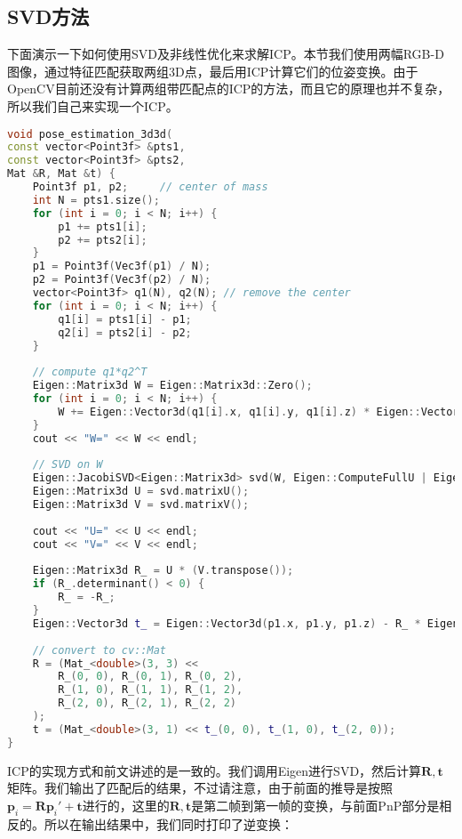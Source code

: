 \subsection{SVD方法}
下面演示一下如何使用SVD及非线性优化来求解ICP。本节我们使用两幅RGB-D图像，通过特征匹配获取两组3D点，最后用ICP计算它们的位姿变换。由于OpenCV目前还没有计算两组带匹配点的ICP的方法，而且它的原理也并不复杂，所以我们自己来实现一个ICP。
\begin{lstlisting}[language=c++,caption=slambook2/ch7/pose\_estimation\_3d3d.cpp（片段）]
void pose_estimation_3d3d(
const vector<Point3f> &pts1,
const vector<Point3f> &pts2,
Mat &R, Mat &t) {
	Point3f p1, p2;     // center of mass
	int N = pts1.size();
	for (int i = 0; i < N; i++) {
		p1 += pts1[i];
		p2 += pts2[i];
	}
	p1 = Point3f(Vec3f(p1) / N);
	p2 = Point3f(Vec3f(p2) / N);
	vector<Point3f> q1(N), q2(N); // remove the center
	for (int i = 0; i < N; i++) {
		q1[i] = pts1[i] - p1;
		q2[i] = pts2[i] - p2;
	}
	
	// compute q1*q2^T
	Eigen::Matrix3d W = Eigen::Matrix3d::Zero();
	for (int i = 0; i < N; i++) {
		W += Eigen::Vector3d(q1[i].x, q1[i].y, q1[i].z) * Eigen::Vector3d(q2[i].x, q2[i].y, q2[i].z).transpose();
	}
	cout << "W=" << W << endl;
	
	// SVD on W
	Eigen::JacobiSVD<Eigen::Matrix3d> svd(W, Eigen::ComputeFullU | Eigen::ComputeFullV);
	Eigen::Matrix3d U = svd.matrixU();
	Eigen::Matrix3d V = svd.matrixV();
	
	cout << "U=" << U << endl;
	cout << "V=" << V << endl;
	
	Eigen::Matrix3d R_ = U * (V.transpose());
	if (R_.determinant() < 0) {
		R_ = -R_;
	}
	Eigen::Vector3d t_ = Eigen::Vector3d(p1.x, p1.y, p1.z) - R_ * Eigen::Vector3d(p2.x, p2.y, p2.z);
	
	// convert to cv::Mat
	R = (Mat_<double>(3, 3) <<
		R_(0, 0), R_(0, 1), R_(0, 2),
		R_(1, 0), R_(1, 1), R_(1, 2),
		R_(2, 0), R_(2, 1), R_(2, 2)
	);
	t = (Mat_<double>(3, 1) << t_(0, 0), t_(1, 0), t_(2, 0));
}
\end{lstlisting}

ICP的实现方式和前文讲述的是一致的。我们调用Eigen进行SVD，然后计算$\bm{R}, \bm{t}$矩阵。我们输出了匹配后的结果，不过请注意，由于前面的推导是按照$\bm{p}_i = \bm{R} \bm{p}_i' + \bm{t}$进行的，这里的$\bm{R}, \bm{t}$是第二帧到第一帧的变换，与前面PnP部分是相反的。所以在输出结果中，我们同时打印了逆变换：

